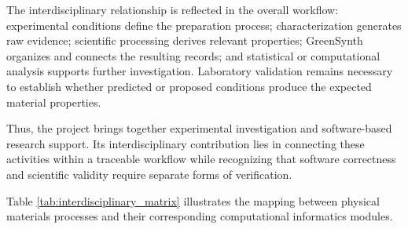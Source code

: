 \documentclass[12pt,a4paper,oneside]{report}
\begin{document}
{{{The interdisciplinary relationship is reflected in the overall workflow: experimental conditions define the preparation process; characterization generates raw evidence; scientific processing derives relevant properties; GreenSynth organizes and connects the resulting records; and statistical or computational analysis supports further investigation. Laboratory validation remains necessary to establish whether predicted or proposed conditions produce the expected material properties.

Thus, the project brings together experimental investigation and software-based research support. Its interdisciplinary contribution lies in connecting these activities within a traceable workflow while recognizing that software correctness and scientific validity require separate forms of verification.

Table \ref{tab:interdisciplinary_matrix} illustrates the mapping between physical materials processes and their corresponding computational informatics modules.

}}}
\end{document}
